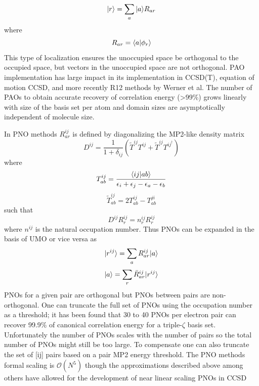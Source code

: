 			\begin{equation}
				| r \rangle = \sum_a | a \rangle R_{ar}
			\end{equation}
		where
				\begin{equation}
					R_{ar} = \langle a|\phi_r\rangle
				\end{equation}
		This type of localization ensures the unoccupied space be orthogonal to the occupied space, but vectors in the unoccupied space are not orthogonal. PAO implementation has large impact in its implementation in CCSD(T), equation of motion CCSD, and more recently R12 methods by Werner et al\cite{Riplinger2013}. The number of PAOs to obtain accurate recovery of correlation energy (>99\%) grows linearly with size of the basis set per atom and domain sizes are asymptotically independent of molecule size.

		In PNO methods $R^{ij}_{ar}$ is defined by diagonalizing the MP2-like density matrix\cite{Yang2012,Neese2009}
			\begin{equation}
				D^{ij} = \frac{1}{1+\delta_{ij}}(\tilde{T}^{ij}T^{ij} + \tilde{T}^{ij}T^{ij^\dagger})
			\end{equation}
		where
			\begin{equation}
				T^{ij}_{ab} = \frac{\langle ij|ab\rangle}{\epsilon_i + \epsilon_j - \epsilon_a - \epsilon_b}
			\end{equation}
			\begin{equation}
				\tilde{T}^{ij}_{ab} = 2T^{ij}_{ab} - T^{ji}_{ab}
			\end{equation}
		such that
			\begin{equation}
				D^{ij}R^{ij}_r = n^{ij}_rR^{ij}_r
			\end{equation}
		where $n^{ij}$ is the natural occupation number. Thus PNOs can be expanded in the basis of UMO or vice versa as
			\begin{equation}
				| r^{ij} \rangle = \sum_a R^{ij}_{ar} | a \rangle
			\end{equation}
			\begin{equation}
				| a \rangle = \sum_r \bar{R}^{ij}_{ar} | r^{ij} \rangle
			\end{equation}
		PNOs for a given pair are orthogonal but PNOs between pairs are non-orthogonal. One can truncate the full set of PNOs using the occupation number as a threshold; it has been found that 30 to 40 PNOs per electron pair can recover 99.9\% of canonical correlation energy for a triple-$\zeta$ basis set. Unfortunately the number of PNOs scales with the number of pairs so the total number of PNOs might still be too large. To compensate one can also truncate the set of [ij] pairs based on a pair MP2 energy threshold. The PNO methods formal scaling is $\mathcal{O}(N^5)$ though the approximations described above among others have allowed for the development of near linear scaling PNOs in CCSD\cite{Riplinger2013}

